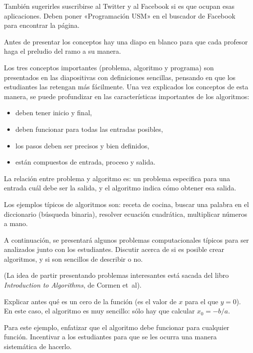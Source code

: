 \documentclass[10pt]{article}
\begin{document}
  También sugerirles suscribirse al Twitter y al Facebook
  si es que ocupan esas aplicaciones.
  Deben poner «Programación USM» en el buscador de Facebook
  para encontrar la página.


  Antes de presentar los conceptos hay una diapo en blanco
  para que cada profesor haga el preludio del ramo a su manera.

  Los tres conceptos importantes (problema, algoritmo y programa)
  son presentados en las diapositivas con definiciones sencillas,
  pensando en que los estudiantes las retengan más fácilmente.
  Una vez explicados los conceptos de esta manera,
  se puede profundizar en las características importantes de los algoritmos:
  \begin{itemize}
    \item deben tener inicio y final,
    \item deben funcionar para todas las entradas posibles,
    \item los pasos deben ser precisos y bien definidos,
    \item están compuestos de entrada, proceso y salida.
  \end{itemize}

  La relación entre problema y algoritmo es:
  un problema especifica para una entrada cuál debe ser la salida,
  y el algoritmo indica cómo obtener esa salida.

  Los ejemplos típicos de algoritmos son:
  receta de cocina,
  buscar una palabra en el diccionario (búsqueda binaria),
  resolver ecuación cuadrática,
  multiplicar números a mano.
  \newpage

  A continuación,
  se presentará algunos problemas computacionales típicos
  para ser analizados junto con los estudiantes.
  Discutir acerca de si es posible crear algoritmos,
  y si son sencillos de describir o no.

  (La idea de partir presentando problemas interesantes
  está sacada del libro \emph{Introduction to Algorithms},
  de Cormen et~al).
 

  Explicar antes qué es un cero de la función
  (es el valor de \(x\) para el que \(y = 0\)).
  En este caso, el algoritmo es muy sencillo:
  sólo hay que calcular \(x_0 = -b/a\).
  

  Para este ejemplo,
  enfatizar que el algoritmo debe funcionar para cualquier función.
  Incentivar a los estudiantes para que se les ocurra
  una manera sistemática de hacerlo.
  
\end{document}
